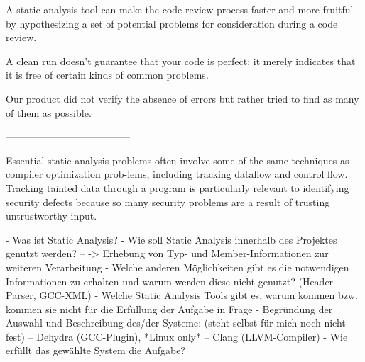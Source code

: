 A static analysis
tool can make the code review process faster and more fruitful by hypothesizing a set of potential problems for consideration during a code review.

A clean run doesn’t guarantee that
your code is perfect; it merely indicates that it is free of certain kinds of
common problems.


Our product did not verify the absence of errors but rather tried to find as many of them as possible.


--------------------------------------

 Essential static analysis problems
often involve some of the same techniques as compiler optimization prob-lems, including tracking dataflow and control flow. Tracking tainted data
through a program is particularly relevant to identifying security defects
because so many security problems are a result of trusting untrustworthy
input.



 - Was ist Static Analysis?
 - Wie soll Static Analysis innerhalb des Projektes genutzt werden?
 -- -> Erhebung von Typ- und Member-Informationen zur weiteren Verarbeitung
 - Welche anderen Möglichkeiten gibt es die notwendigen Informationen zu erhalten und warum werden diese nicht genutzt? (Header-Parser, GCC-XML)
 - Welche Static Analysis Tools gibt es, warum kommen bzw. kommen sie nicht für die Erfüllung der Aufgabe in Frage
 - Begründung der Auswahl und Beschreibung des/der Systeme: (steht selbst für mich noch nicht fest)
 -- Dehydra (GCC-Plugin), *Linux only*
 -- Clang (LLVM-Compiler)
 - Wie erfüllt das gewählte System die Aufgabe?